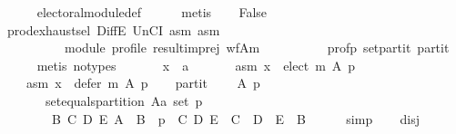 \begin{isabellebody}
\ \ \ \ \isamarkupfalse%
\ electoral{\isacharunderscore}{\kern0pt}module{\isacharunderscore}{\kern0pt}def\isanewline
\ \ \ \ \isamarkupfalse%
\ metis\isanewline
\ \ \isamarkupfalse%
\ {\isachardoublequoteopen}False{\isachardoublequoteclose}\isanewline
\ \ \ \ \isamarkupfalse%
\ prod{\isachardot}{\kern0pt}exhaust{\isacharunderscore}{\kern0pt}sel\ DiffE\ UnCI\ asm{}\ asm{}\isanewline
\ \ \ \ \ \ \ \ \ \ module\ profile\ result{\isacharunderscore}{\kern0pt}imp{\isacharunderscore}{\kern0pt}rej\ wf{\isacharunderscore}{\kern0pt}A{\isacharunderscore}{\kern0pt}m\isanewline
\ \ \ \ \ \ \ \ \ \ prof{\isacharunderscore}{\kern0pt}p\ set{\isacharunderscore}{\kern0pt}partit\ partit\isanewline
\ \ \ \ \isamarkupfalse%
\ {\isacharparenleft}{\kern0pt}metis\ {\isacharparenleft}{\kern0pt}no{\isacharunderscore}{\kern0pt}types{\isacharparenright}{\kern0pt}{\isacharparenright}{\kern0pt}\isanewline
{}\isamarkupfalse%
\isanewline
\ \ \isamarkupfalse%
\isanewline
\ \ \ \ x\ {\isacharcolon}{\kern0pt}{\isacharcolon}{\kern0pt}\ {\isachardoublequoteopen}{\isacharprime}{\kern0pt}a{\isachardoublequoteclose}\isanewline
\ \ \isamarkupfalse%
\isanewline
\ \ \ \ asm{}{\isacharcolon}{\kern0pt}\ {\isachardoublequoteopen}x\ {\isasymin}\ elect\ m\ A\ p{\isachardoublequoteclose}\ \isanewline
\ \ \ \ asm{}{\isacharcolon}{\kern0pt}\ {\isachardoublequoteopen}x\ {\isasymin}\ defer\ m\ A\ p{\isachardoublequoteclose}\isanewline
\ \ \isamarkupfalse%
\ partit{\isacharcolon}{\kern0pt}\isanewline
\ \ \ \ {\isachardoublequoteopen}{\isasymforall}A\ p{\isachardot}{\kern0pt}\isanewline
\ \ \ \ \ \ {\isasymnot}\ set{\isacharunderscore}{\kern0pt}equals{\isacharunderscore}{\kern0pt}partition\ {\isacharparenleft}{\kern0pt}A{\isacharcolon}{\kern0pt}{\isacharcolon}{\kern0pt}{\isacharprime}{\kern0pt}a\ set{\isacharparenright}{\kern0pt}\ p\ {\isasymor}\isanewline
\ \ \ \ \ \ \ \ {\isacharparenleft}{\kern0pt}{\isasymexists}B\ C\ D\ E{\isachardot}{\kern0pt}\ A\ {\isacharequal}{\kern0pt}\ B\ {\isasymand}\ p\ {\isacharequal}{\kern0pt}\ {\isacharparenleft}{\kern0pt}C{\isacharcomma}{\kern0pt}\ D{\isacharcomma}{\kern0pt}\ E{\isacharparenright}{\kern0pt}\ {\isasymand}\ C\ {\isasymunion}\ D\ {\isasymunion}\ E\ {\isacharequal}{\kern0pt}\ B{\isacharparenright}{\kern0pt}{\isachardoublequoteclose}\isanewline
\ \ \ \ \isamarkupfalse%
\ simp\isanewline
\ \ \isamarkupfalse%
\ disj{\isacharcolon}{\kern0pt}\isanewline

\end{isabellebody}
